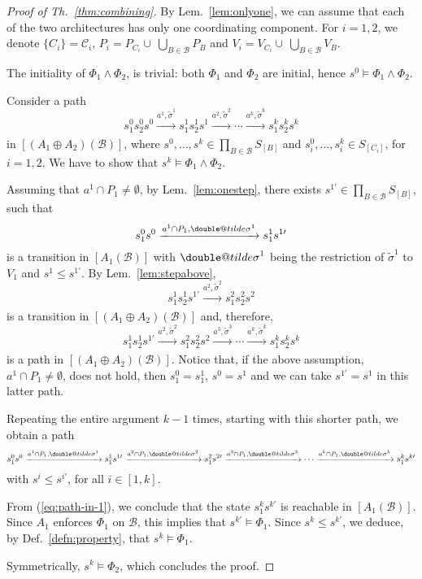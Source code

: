 \documentclass{llncs}
\makeatletter
\newcommand{\defn}[1]{Def.~\ref{defn:#1}}
\newcommand{\eq}[1]{(\ref{eq:#1})}
\newcommand{\lem}[1]{Lem.~\ref{lem:#1}}
\newcommand{\thm}[1]{Th.~\ref{thm:#1}}
\newcommand{\cB}{\ensuremath{\mathcal{B}}}
\newcommand{\cC}{\ensuremath{\mathcal{C}}}
\newcommand{\goesto}[2][]{\ensuremath{\xrightarrow[#1]{#2}}}
\newcommand{\val}[3][]{%
  \ensuremath{#1{\sigma}^{#2}_{#3}}%
}
\newcommand{\semopen}[1]{\ensuremath{[{#1}]}}
\newcommand{\arcomp}{\oplus}
\newcommand{\order}{\leqslant}
\newcommand{\doubletilde}[1]{{%
  \mathpalette\double@tilde{#1}%
}}
\newcommand{\double@tilde}[2]{%
  \sbox\z@{$\m@th#1\tilde{#2}$}%
  \ht\z@=.9\ht\z@
  \tilde{\box\z@}%
}
\makeatother
\begin{document}
\begin{proof}[Proof of \thm{combining}]
  By \lem{onlyone}, we can assume that each of the two
  architectures has only one coordinating component.  For $i =
  1,2$, we denote $\{C_i\} = \cC_i$, $P_i = P_{C_i}
  \cup\ \bigcup_{B \in \cB} P_B$ and $V_i = V_{C_i}
  \cup\ \bigcup_{B \in \cB} V_B$.
  
  The initiality of $\Phi_1 \land \Phi_2$, is trivial: both
  $\Phi_1$ and $\Phi_2$ are initial, hence $s^0 \models \Phi_1
  \land \Phi_2$.

  Consider a path
%
  \[
  s^0_1 s^0_2 s^0
%
  \goesto{a^1, \val[\tilde]{1}{}}
%
  s^1_1 s^1_2 s^1
%
  \goesto{a^2, \val[\tilde]{2}{}}
  \cdots
  \goesto{a^k, \val[\tilde]{k}{}}
%
  s^k_1 s^k_2 s^k
  \]
%
  in $\semopen{(A_1 \arcomp A_2)(\cB)}$, where
  $s^0,\dots,s^k \in \prod_{B \in \cB} S_{\semopen{B}}$ and
  $s^0_i,\dots, s^k_i \in S_{\semopen{C_i}}$, for $i=1,2$.
  We have to show that $s^k \models \Phi_1 \land \Phi_2$.

  Assuming that $a^1 \cap P_1 \neq \emptyset$, by \lem{onestep},
  there exists $s^{1\prime} \in \prod_{B \in \cB} S_{\semopen{B}}$,
  such that
%
  \[
  s^0_1 s^0
%
  \goesto{a^1 \cap P_1, \val[\doubletilde]{1}{}}
%
  s^1_1 s^{1\prime}
  \]
%
  is a transition in $\semopen{A_1(\cB)}$ with
  $\val[\doubletilde]{1}{}$ being the restriction of
  $\val[\tilde]{1}{}$ to $V_1$ and
  $s^1 \order s^{1\prime}$.
%
  By \lem{stepabove}, 
  \[
  s^1_1 s^1_2 s^{1\prime}
%
  \goesto{a^2, \val[\tilde]{2}{}}
%
  s^2_1 s^2_2 s^2
  \]
  is a transition in $\semopen{(A_1 \arcomp A_2)(\cB)}$ and,
  therefore, 
  \[
  s^1_1 s^1_2 s^{1\prime}
%
  \goesto{a^2, \val[\tilde]{2}{}}
%
  s^2_1 s^2_2 s^2
%
  \goesto{a^3, \val[\tilde]{3}{}}
  \cdots
  \goesto{a^k, \val[\tilde]{k}{}}
%
  s^k_1 s^k_2 s^k
  \]
%  
  is a path in $\semopen{(A_1 \arcomp A_2)(\cB)}$.
%
  Notice that, if the above assumption, $a^1 \cap P_1 \neq
  \emptyset$, does not hold, then $s^0_1 = s^1_1$, $s^0 = s^1$
  and we can take $s^{1\prime} = s^1$ in this latter path.

  Repeating the entire argument $k-1$ times, starting with this
  shorter path, we obtain a path
%
  \begin{equation}
    \label{eq:path-in-1}
    s^0_1 s^0
    \goesto{a^1 \cap P_1, \val[\doubletilde]{1}{}}
    s^1_1 s^{1\prime}
    \goesto{a^2 \cap P_1, \val[\doubletilde]{2}{}}
    s^2_1 s^{2\prime}
    \goesto{a^3 \cap P_1, \val[\doubletilde]{3}{}}
    \cdots
    \goesto{a^k \cap P_1, \val[\doubletilde]{k}{}}
    s^k_1 s^{k\prime}
  \end{equation}
%  
  with $s^i \order s^{i\prime}$, for all $i \in [1,k]$.

  From \eq{path-in-1}, we conclude that the state $s^k_1
  s^{k\prime}$ is reachable in $\semopen{A_1(\cB)}$.  Since $A_1$
  enforces $\Phi_1$ on $\cB$, this implies that $s^{k\prime}
  \models \Phi_1$.  Since $s^k \order s^{k\prime}$, we deduce, by
  \defn{property}, that $s^k \models \Phi_1$.

  Symmetrically, $s^k \models \Phi_2$, which concludes
  the proof.
\end{proof}
\end{document}
